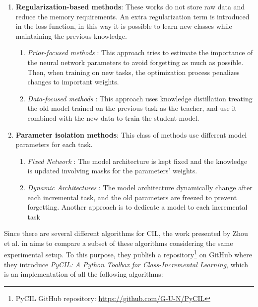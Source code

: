 \begin{enumerate}
    \item \textbf{Regularization-based methods}: These works do not store raw data and reduce the memory requirements. An extra regularization term is introduced in the loss function, in this way it is possible to learn new classes while maintaining the previous knowledge.
    \begin{enumerate}
        \item \textit{Prior-focused methods} \cite{kirkpatrick2017overcoming, lee2017overcoming, zenke2017continual, liu2018rotate, aljundi2018memory, chaudhry2018riemannian}: This approach tries to estimate the importance of the neural network parameters to avoid forgetting as much as possible. Then, when training on new tasks, the optimization process penalizes changes to important weights.
        \item \textit{Data-focused methods} \cite{li2017learning, jung2016less, zhang2020class, rannen2017encoder}: This approach uses knowledge distillation \cite{hinton2015distilling} treating the old model trained on the previous task as the teacher, and use it combined with the new data to train the student model.
    \end{enumerate}
    \item \textbf{Parameter isolation methods}: This class of methods use different model parameters for each task.
    \begin{enumerate}
        \item \textit{Fixed Network} \cite{mallya2018packnet, mallya2018piggyback, serra2018overcoming, fernando2017pathnet}: The model architecture is kept fixed and the knowledge is updated involving masks for the parameters' weights.
        \item \textit{Dynamic Architectures} \cite{rusu2016progressive, xu2018reinforced, aljundi2017expert, rosenfeld2018incremental}: The model architecture dynamically change after each incremental task, and the old parameters are freezed to prevent forgetting. Another approach is to dedicate a model to each incremental task
    \end{enumerate}
\end{enumerate}

Since there are several different algorithms for CIL, the work presented by Zhou et al. in \cite{zhou2021pycil} aims to compare a subset of these algorithms considering the same experimental setup. To this purpose, they publish a repository\footnote{PyCIL GitHub repository: \href{https://github.com/G-U-N/PyCIL}{https://github.com/G-U-N/PyCIL}}
on GitHub where they introduce \textit{PyCIL: A Python Toolbox for Class-Incremental Learning}, which is an implementation of all the following algorithms:

